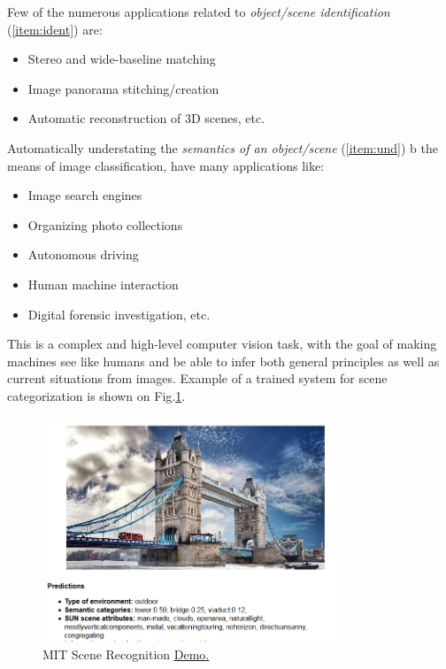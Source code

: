 Few of the numerous applications related to {\em object/scene identification} (\ref{item:ident}) are:
\begin{itemize}
\item Stereo and wide-baseline matching
\item Image panorama stitching/creation
\item Automatic reconstruction of 3D scenes, etc.
\end{itemize}

Automatically understating the {\em semantics of an object/scene} (\ref{item:und}) b the means of image classification, have many applications like:
\begin{itemize}
\item Image search engines
\item Organizing photo collections
\item Autonomous driving
\item Human machine interaction
\item Digital forensic investigation, etc.
\end{itemize}

This is a complex and high-level computer vision task, with the goal of making machines see like humans and be able to infer both general principles as well as current situations from images. Example of a trained system for scene categorization is shown on Fig.\ref{fig:mitdemo}.
\begin{figure}[H]
\begin{center}
\includegraphics[width=0.8\textwidth]{fig/mitdemo}
\end{center}
\caption{ MIT Scene Recognition \href{http://places.csail.mit.edu/demo.html}{\underline{Demo}.}}
\label{fig:mitdemo}
\end{figure}

